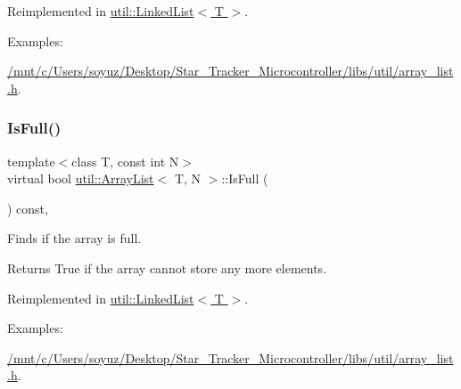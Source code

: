 Reimplemented in \hyperlink{classutil_1_1LinkedList_abd21d7bb75ae121a4f164e1917845470}{util\+::\+Linked\+List$<$ T $>$}.

\begin{Desc}
\item[Examples\+: ]\par
\hyperlink{_2mnt_2c_2Users_2soyuz_2Desktop_2Star_Tracker_Microcontroller_2libs_2util_2array_list_8h-example}{/mnt/c/\+Users/soyuz/\+Desktop/\+Star\+\_\+\+Tracker\+\_\+\+Microcontroller/libs/util/array\+\_\+list.\+h}.\end{Desc}
\mbox{\label{classutil_1_1ArrayList_a09c81f9117f52503ee49e335c44fdd63}} 
\subsubsection{\texorpdfstring{Is\+Full()}{IsFull()}}
{\footnotesize\ttfamily template$<$class T, const int N$>$ \\
virtual bool \hyperlink{classutil_1_1ArrayList}{util\+::\+Array\+List}$<$ T, N $>$\+::Is\+Full (\begin{DoxyParamCaption}{ }\end{DoxyParamCaption}) const\hspace{0.3cm}{\ttfamily [inline]}, {\ttfamily [virtual]}}



Finds if the array is full. 

\begin{DoxyReturn}{Returns}
True if the array cannot store any more elements. 
\end{DoxyReturn}


Reimplemented in \hyperlink{classutil_1_1LinkedList_aea5cd5b77e721fc152985904e391fc6d}{util\+::\+Linked\+List$<$ T $>$}.

\begin{Desc}
\item[Examples\+: ]\par
\hyperlink{_2mnt_2c_2Users_2soyuz_2Desktop_2Star_Tracker_Microcontroller_2libs_2util_2array_list_8h-example}{/mnt/c/\+Users/soyuz/\+Desktop/\+Star\+\_\+\+Tracker\+\_\+\+Microcontroller/libs/util/array\+\_\+list.\+h}.\end{Desc}
\mbox{\label{classutil_1_1ArrayList_a272326016b27e5e48f0112a468b1f7b2}} 
